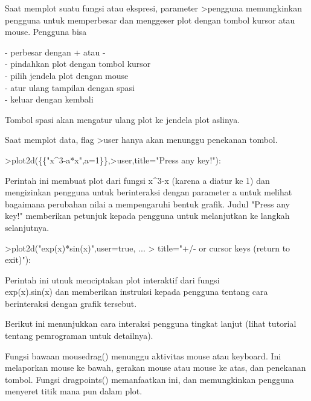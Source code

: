 \documentclass{article}
\begin{document}
\begin{eulernotebook}
\begin{eulercomment}
\begin{eulercomment}
\begin{eulercomment}
\begin{eulercomment}
\begin{eulercomment}
\begin{eulercomment}
\begin{eulercomment}
\begin{eulercomment}
\begin{eulercomment}
\end{eulercomment}
\begin{eulercomment}
Saat memplot suatu fungsi atau ekspresi, parameter \textgreater{}pengguna
memungkinkan pengguna untuk memperbesar dan menggeser plot dengan
tombol kursor atau mouse. Pengguna bisa

- perbesar dengan + atau -\\
- pindahkan plot dengan tombol kursor\\
- pilih jendela plot dengan mouse\\
- atur ulang tampilan dengan spasi\\
- keluar dengan kembali

Tombol spasi akan mengatur ulang plot ke jendela plot aslinya.

Saat memplot data, flag \textgreater{}user hanya akan menunggu penekanan tombol.
\end{eulercomment}
\begin{eulerprompt}
>plot2d(\{\{"x^3-a*x",a=1\}\},>user,title="Press any key!"):
\end{eulerprompt}
\begin{eulercomment}
Perintah ini membuat plot dari fungsi x\textasciicircum{}3-x (karena a diatur ke 1) dan
mengizinkan pengguna untuk berinteraksi dengan parameter a untuk
melihat bagaimana perubahan nilai a mempengaruhi bentuk grafik. Judul
"Press any key!" memberikan petunjuk kepada pengguna untuk melanjutkan
ke langkah selanjutnya.
\end{eulercomment}
\begin{eulerprompt}
>plot2d("exp(x)*sin(x)",user=true, ...
>  title="+/- or cursor keys (return to exit)"):
\end{eulerprompt}
\begin{eulercomment}
Perintah ini utnuk menciptakan plot interaktif dari fungsi \\
exp(x).sin(x) dan memberikan instruksi kepada pengguna tentang cara
berinteraksi dengan grafik tersebut.

Berikut ini menunjukkan cara interaksi pengguna tingkat lanjut (lihat
tutorial tentang pemrograman untuk detailnya).

Fungsi bawaan mousedrag() menunggu aktivitas mouse atau keyboard. Ini
melaporkan mouse ke bawah, gerakan mouse atau mouse ke atas, dan
penekanan tombol. Fungsi dragpoints() memanfaatkan ini, dan
memungkinkan pengguna menyeret titik mana pun dalam plot.


\end{eulercomment}
\end{eulercomment}
\end{eulercomment}
\end{eulercomment}
\end{eulercomment}
\end{eulercomment}
\end{eulercomment}
\end{eulercomment}
\end{eulercomment}
\end{eulernotebook}
\end{document}
